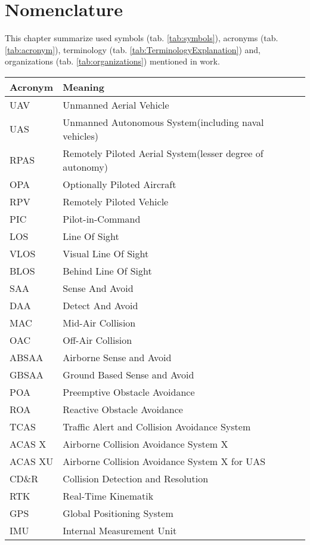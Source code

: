 \section*{Nomenclature}
\noindent
This chapter summarize used symbols (tab. \ref{tab:symbols}), acronyms (tab. \ref{tab:acronym}), terminology (tab. \ref{tab:TerminologyExplanation}) and, organizations (tab. \ref{tab:organizations}) mentioned in work. 

\begin{tabularx}{\textwidth}{l|X} 
    Acronym & Meaning\\ \hline\hline
    UAV & Unmanned Aerial Vehicle\\ 
    UAS & Unmanned Autonomous System(including naval vehicles)\\ 
    RPAS & Remotely Piloted Aerial System(lesser degree of autonomy)\\ 
    OPA & Optionally Piloted Aircraft\\
    RPV & Remotely Piloted Vehicle\\
    PIC & Pilot-in-Command\\\hline
    LOS & Line Of Sight\\ 
    VLOS & Visual Line Of Sight\\ 
    BLOS & Behind Line Of Sight\\ \hline
    SAA & Sense And Avoid\\ 
    DAA & Detect And Avoid \\ 
    MAC & Mid-Air Collision \\
    OAC & Off-Air Collision \\
    ABSAA & Airborne Sense and Avoid\\
    GBSAA & Ground Based Sense and Avoid\\
    POA & Preemptive Obstacle Avoidance\\
    ROA & Reactive Obstacle Avoidance \\\hline
    TCAS &Traffic Alert and Collision Avoidance System\\
    ACAS X & Airborne Collision Avoidance System X\\
    ACAS XU & Airborne Collision Avoidance System X for UAS\\
    CD\&R & Collision Detection and Resolution\\ \hline
    RTK & Real-Time Kinematik\\ 
    GPS & Global Positioning System\\ 
    IMU & Internal Measurement Unit\\ 

\end{tabularx}
